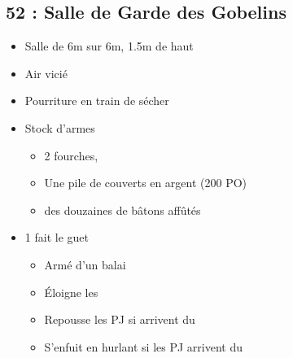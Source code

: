\subsection{52 : Salle de Garde des Gobelins}\label{n3:s52}
\begin{itemize}
  \item Salle de 6m sur 6m, 1.5m de haut
  \item Air vicié
  \item Pourriture en train de sécher
  \item Stock d'armes \textbf{}
  \begin{itemize}
    \item 2 fourches,
    \item Une pile de couverts en argent (200 PO)
    \item des douzaines de bâtons affûtés
  \end{itemize}
  \item 1 \textbf{} fait le guet
  \begin{itemize}
    \item Armé d'un balai
    \item \'Eloigne les \textbf{}
    \item Repousse les PJ si arrivent du \textbf{}
    \item S'enfuit en hurlant si les PJ arrivent du \textbf{}
  \end{itemize}
\end{itemize}
